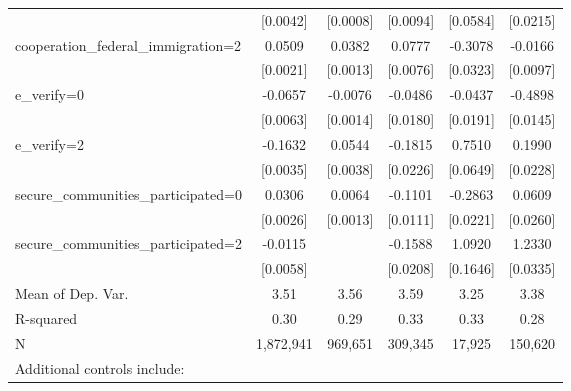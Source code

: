 \begin{table}[htbp]
\begin{tabular}{l*{5}{c}}
                    &    [0.0042]         &    [0.0008]         &    [0.0094]         &    [0.0584]         &    [0.0215]         \\
\addlinespace
cooperation\_federal\_immigration=2&      0.0509\sym{***}&      0.0382\sym{***}&      0.0777\sym{***}&     -0.3078\sym{***}&     -0.0166\sym{*}  \\
                    &    [0.0021]         &    [0.0013]         &    [0.0076]         &    [0.0323]         &    [0.0097]         \\
\addlinespace
e\_verify=0          &     -0.0657\sym{***}&     -0.0076\sym{***}&     -0.0486\sym{***}&     -0.0437\sym{**} &     -0.4898\sym{***}\\
                    &    [0.0063]         &    [0.0014]         &    [0.0180]         &    [0.0191]         &    [0.0145]         \\
\addlinespace
e\_verify=2          &     -0.1632\sym{***}&      0.0544\sym{***}&     -0.1815\sym{***}&      0.7510\sym{***}&      0.1990\sym{***}\\
                    &    [0.0035]         &    [0.0038]         &    [0.0226]         &    [0.0649]         &    [0.0228]         \\
\addlinespace
secure\_communities\_participated=0&      0.0306\sym{***}&      0.0064\sym{***}&     -0.1101\sym{***}&     -0.2863\sym{***}&      0.0609\sym{**} \\
                    &    [0.0026]         &    [0.0013]         &    [0.0111]         &    [0.0221]         &    [0.0260]         \\
\addlinespace
secure\_communities\_participated=2&     -0.0115\sym{*}  &                     &     -0.1588\sym{***}&      1.0920\sym{***}&      1.2330\sym{***}\\
                    &    [0.0058]         &                     &    [0.0208]         &    [0.1646]         &    [0.0335]         \\
\midrule
Mean of Dep. Var.   &        3.51         &        3.56         &        3.59         &        3.25         &        3.38         \\
R-squared           &        0.30         &        0.29         &        0.33         &        0.33         &        0.28         \\
N                   &   1,872,941         &     969,651         &     309,345         &      17,925         &     150,620         \\
\bottomrule
\multicolumn{6}{l}{\footnotesize Additional controls include:}\\

\end{tabular}
\end{table}

